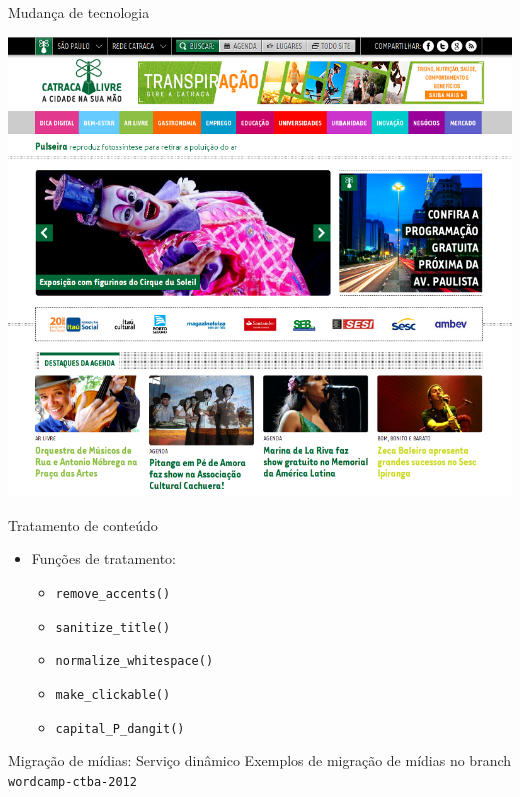 \documentclass[handout]{beamer}
\begin{document}
\begin{frame}{Mudança de tecnologia}
  \begin{center}
    \pause \includegraphics[height=0.8\textheight,natwidth=800,natheight=731]{./img/catracalivre.png}
  \end{center}
\end{frame}

\begin{frame}{Tratamento de conteúdo}
  \begin{itemize}
    \pause \item Funções de tratamento:
    \begin{itemize}
      \pause \item \texttt{remove\_accents()}
      \pause \item \texttt{sanitize\_title()}
      \pause \item \texttt{normalize\_whitespace()}
      \pause \item \texttt{make\_clickable()}
      \pause \item \texttt{capital\_P\_dangit()}
    \end{itemize}
  \end{itemize}
\end{frame}

\begin{frame}{Migração de mídias: Serviço dinâmico}
  \pause Exemplos de migração de mídias no branch \texttt{wordcamp-ctba-2012}
\end{frame}
\end{document}
